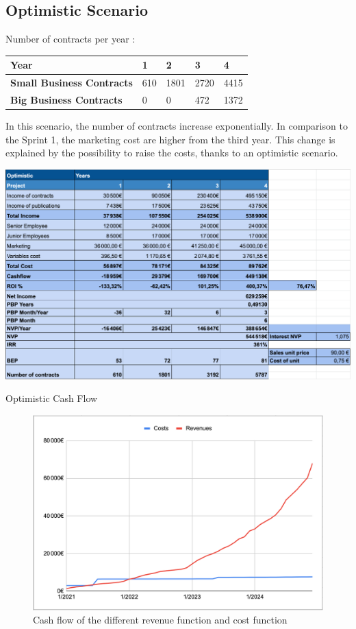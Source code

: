 \documentclass[./main.tex]{subfiles}
\begin{document}
\subsection{Optimistic Scenario}
Number of contracts per year : 
\begin{table}[H]
	\centering
\begin{tabular}{|l|l|l|l|l|}
\hline
\textbf{Year}                     & 1  & 2   & 3   & 4   \\ \hline
\textbf{Small Business Contracts} & 610 & 1801 & 2720 & 4415 \\ \hline
\textbf{Big Business Contracts}   & 0  & 0   & 472  & 1372 \\ \hline
\end{tabular}
\end{table}
In this scenario, the number of contracts increase exponentially. 
In comparison to the Sprint 1, the marketing cost are higher from the third year. This change is explained by the possibility to raise the costs, thanks to an optimistic scenario.
\begin{table}[H]
	\centering
	\includegraphics[width=14cm]{img/optimistic.png}
	\caption{Optimistic Cash Flow}
	\label{tab:optimistic}
\end{table}

\begin{figure}[h]
	\centering
	\includegraphics[width=15cm]{img/CashFlowOptimistic.png}
	\caption{Cash flow of the different revenue function and cost function}
	\label{fig:cashflow}
\end{figure}
\end{document}
